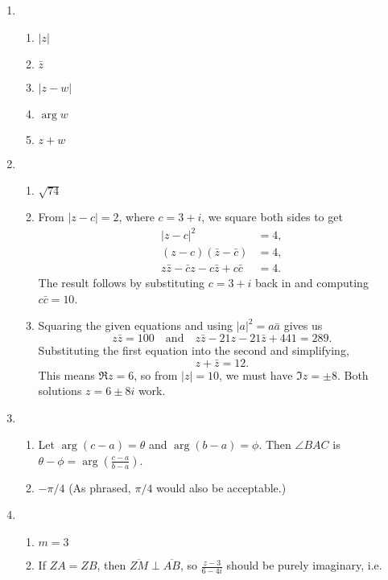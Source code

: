 \begin{enumerate}
\item \begin{enumerate}
\item $\lvert z\rvert$
\item $\bar{z}$
\item $\lvert z - w\rvert$
\item $\arg w$
\item $z + w$
\end{enumerate}
\item \begin{enumerate}
\item $\sqrt{74}$
\item From $\lvert z - c\rvert = 2$, where $c = 3 + i$, we square both sides to get
\begin{align*}
\lvert z - c\rvert^2 &= 4, \\
(z - c)(\bar{z} - \bar{c}) &= 4, \\
z\bar{z} - \bar{c}z - c\bar{z} + c\bar{c} &= 4.
\end{align*}
The result follows by substituting $c = 3 + i$ back in and computing $c\bar{c} = 10$.
\item Squaring the given equations and using $\lvert a\rvert^2 = a\bar{a}$ gives us
\begin{equation*}
z\bar{z} = 100\quad\text{and}\quad z\bar{z} - 21z - 21\bar{z} + 441 = 289.
\end{equation*}
Substituting the first equation into the second and simplifying,
\begin{equation*}
z + \bar{z} = 12.
\end{equation*}
This means $\Re z = 6$, so from $\lvert z\rvert = 10$, we must have $\Im z = \pm 8$. Both solutions $z = 6\pm 8i$ work.
\end{enumerate}
\item \begin{enumerate}
\item Let $\arg(c - a) = \theta$ and $\arg(b - a) = \phi$. Then $\angle BAC$ is $\theta - \phi = \arg(\frac{c - a}{b - a})$.
\item $-\pi/4$ (As phrased, $\pi/4$ would also be acceptable.)
\end{enumerate}
\item \begin{enumerate}
\item $m = 3$
\item If $ZA = ZB$, then $\overline{ZM}\perp\overline{AB}$, so $\frac{z - 3}{6 - 4i}$ should be purely imaginary, i.e.

\end{enumerate}
\end{enumerate}
